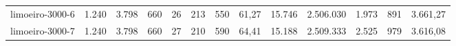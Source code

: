 \begin{table}[ht!]
{\begin{tabular}{lrrrrrrrrrrrr}
			\rowcolor{rowlight}limoeiro-3000-6                                                        & 1.240 & 3.798 & 660 & 26 & 213 & 550 & 61,27 & 15.746  & 2.506.030  & 1.973 & 891   & 3.661,27 \\
			\rowcolor{rowlight}limoeiro-3000-7                                                        & 1.240 & 3.798 & 660 & 27 & 210 & 590 & 64,41 & 15.188  & 2.509.333  & 2.525 & 979   & 3.616,08 \\ \bottomrule
		\end{tabular}%
	}
\end{table}

\begin{table}[ht!]
	\centering
	\caption{Results of the Model \textsc{Path-CBRP-MTZ}.}
	\label{tab:results-det-path-cbrp-mtz-exp}
\end{table}
